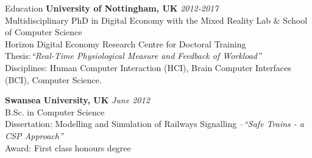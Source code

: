 \documentclass{resume} %
\begin{document}

\begin{rSection}{Education}
{\bf University of Nottingham, UK} \hfill {\em 2012-2017} \\
Multidisciplinary PhD in Digital Economy with the Mixed Reality Lab \& School of Computer Science \\
Horizon Digital Economy Research Centre for Doctoral Training \\
Thesis:\emph{``Real-Time Physiological Measure and Feedback of Workload''}\\
Disciplines: Human Computer Interaction (HCI), Brain Computer Interfaces (BCI), Computer Science.
\vspace{-1 mm}

{\bf Swansea University, UK} \hfill {\em June 2012} \\
B.Sc. in Computer Science \\
Dissertation: Modelling and Simulation of Railways Signalling –\emph{``Safe Trains - a CSP Approach''}\smallskip \\
Award: First class honours degree

\end{rSection}
\end{document}
